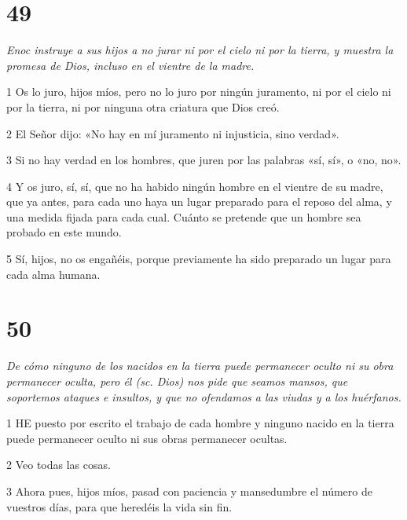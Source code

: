 \chapter{49}

\par \textit{Enoc instruye a sus hijos a no jurar ni por el cielo ni por la tierra, y muestra la promesa de Dios, incluso en el vientre de la madre.}

\par 1 Os lo juro, hijos míos, pero no lo juro por ningún juramento, ni por el cielo ni por la tierra, ni por ninguna otra criatura que Dios creó.

\par 2 El Señor dijo: «No hay en mí juramento ni injusticia, sino verdad».

\par 3 Si no hay verdad en los hombres, que juren por las palabras «sí, sí», o «no, no».

\par 4 Y os juro, sí, sí, que no ha habido ningún hombre en el vientre de su madre, que ya antes, para cada uno haya un lugar preparado para el reposo del alma, y ​​una medida fijada para cada cual. Cuánto se pretende que un hombre sea probado en este mundo.

\par 5 Sí, hijos, no os engañéis, porque previamente ha sido preparado un lugar para cada alma humana.

\chapter{50}

\par \textit{De cómo ninguno de los nacidos en la tierra puede permanecer oculto ni su obra permanecer oculta, pero él (sc. Dios) nos pide que seamos mansos, que soportemos ataques e insultos, y que no ofendamos a las viudas y a los huérfanos.}

\par 1 HE puesto por escrito el trabajo de cada hombre y ninguno nacido en la tierra puede permanecer oculto ni sus obras permanecer ocultas.

\par 2 Veo todas las cosas.

\par 3 Ahora pues, hijos míos, pasad con paciencia y mansedumbre el número de vuestros días, para que heredéis la vida sin fin.

